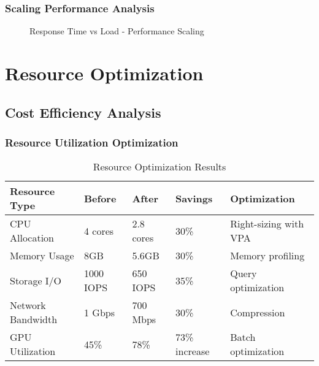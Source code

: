 \subsubsection{Scaling Performance Analysis}

\begin{figure}[H]
\centering
{}
\caption{Response Time vs Load - Performance Scaling}
\label{fig:performance_scaling}
\end{figure}

\section{Resource Optimization}

\subsection{Cost Efficiency Analysis}

\subsubsection{Resource Utilization Optimization}

\begin{table}[H]
\centering
\caption{Resource Optimization Results}
\begin{tabular}{|p{3cm}|p{2cm}|p{2cm}|p{2cm}|p{3cm}|}
\hline
\textbf{Resource Type} & \textbf{Before} & \textbf{After} & \textbf{Savings} & \textbf{Optimization} \\
\hline
CPU Allocation & 4 cores & 2.8 cores & 30\% & Right-sizing with VPA \\
\hline
Memory Usage & 8GB & 5.6GB & 30\% & Memory profiling \\
\hline
Storage I/O & 1000 IOPS & 650 IOPS & 35\% & Query optimization \\
\hline
Network Bandwidth & 1 Gbps & 700 Mbps & 30\% & Compression \\
\hline
GPU Utilization & 45\% & 78\% & 73\% increase & Batch optimization \\
\hline
\end{tabular}
\end{table}

